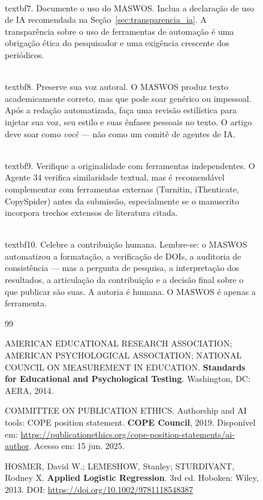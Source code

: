 \begin{figure}
\\textbf{7. Documente o uso do MASWOS.} Inclua a declaração
de uso de IA recomendada na Seção~\ref{sec:transparencia_ia}.
A transparência sobre o uso de ferramentas de automação é uma
obrigação ética do pesquisador e uma exigência crescente dos
periódicos.

\\textbf{8. Preserve sua voz autoral.} O MASWOS produz
texto academicamente correto, mas que pode soar genérico ou
impessoal. Após a redação automatizada, faça uma revisão
estilística para injetar sua voz, seu estilo e suas ênfases
pessoais no texto. O artigo deve soar como \textit{você} —
não como um comitê de agentes de IA.

\\textbf{9. Verifique a originalidade com ferramentas
independentes.} O Agente 34 verifica similaridade textual,
mas é recomendável complementar com ferramentas externas
(Turnitin, iThenticate, CopySpider) antes da submissão,
especialmente se o manuscrito incorpora trechos extensos de
literatura citada.

\\textbf{10. Celebre a contribuição humana.} Lembre-se: o
MASWOS automatizou a formatação, a verificação de DOIs, a
auditoria de consistência — mas a pergunta de pesquisa, a
interpretação dos resultados, a articulação da contribuição e
a decisão final sobre o que publicar são suas. A autoria é
humana. O MASWOS é apenas a ferramenta.


\begin{thebibliography}{99}

AMERICAN EDUCATIONAL RESEARCH ASSOCIATION; AMERICAN PSYCHOLOGICAL
ASSOCIATION; NATIONAL COUNCIL ON MEASUREMENT IN EDUCATION.
\textbf{Standards for Educational and Psychological Testing}.
Washington, DC: AERA, 2014.

COMMITTEE ON PUBLICATION ETHICS.
Authorship and AI tools: COPE position statement.
\textbf{COPE Council}, 2019.
Disponível em:
\url{https://publicationethics.org/cope-position-statements/ai-author}.
Acesso em: 15 jun. 2025.

HOSMER, David W.; LEMESHOW, Stanley; STURDIVANT, Rodney X.
\textbf{Applied Logistic Regression}. 3rd ed.
Hoboken: Wiley, 2013.
DOI: \url{https://doi.org/10.1002/9781118548387}


\end{thebibliography}
\end{figure}

